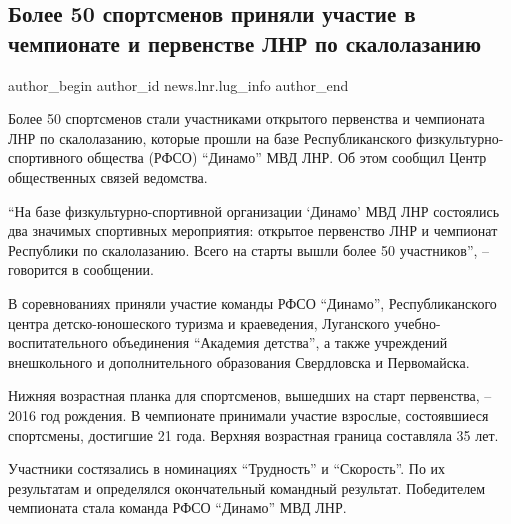  
 
 
 
 
\subsection{Более 50 спортсменов приняли участие в чемпионате и первенстве ЛНР по скалолазанию}
\label{sec:17_01_2022.stz.news.lnr.lug_info.1.skalolazanie}

\ifcmt
 author_begin
   author_id news.lnr.lug_info
 author_end
\fi

Более 50 спортсменов стали участниками открытого первенства и чемпионата ЛНР по
скалолазанию, которые прошли на базе Республиканского физкультурно-спортивного
общества (РФСО) \enquote{Динамо} МВД ЛНР. Об этом сообщил Центр общественных связей
ведомства.

\enquote{На базе физкультурно-спортивной организации 
\enquote{Динамо} МВД ЛНР состоялись два
значимых спортивных мероприятия: открытое первенство ЛНР и чемпионат Республики
по скалолазанию. Всего на старты вышли более 50 участников}, – говорится в
сообщении.

В соревнованиях приняли участие команды РФСО \enquote{Динамо}, Республиканского центра
детско-юношеского туризма и краеведения, Луганского учебно-воспитательного
объединения \enquote{Академия детства}, а также учреждений внешкольного и
дополнительного образования Свердловска и Первомайска.

Нижняя возрастная планка для спортсменов, вышедших на старт первенства, – 2016
год рождения. В чемпионате принимали участие взрослые, состоявшиеся спортсмены,
достигшие 21 года. Верхняя возрастная граница составляла 35 лет.

Участники состязались в номинациях \enquote{Трудность} и \enquote{Скорость}. По их результатам
и определялся окончательный командный результат. Победителем чемпионата стала
команда РФСО \enquote{Динамо} МВД ЛНР.

